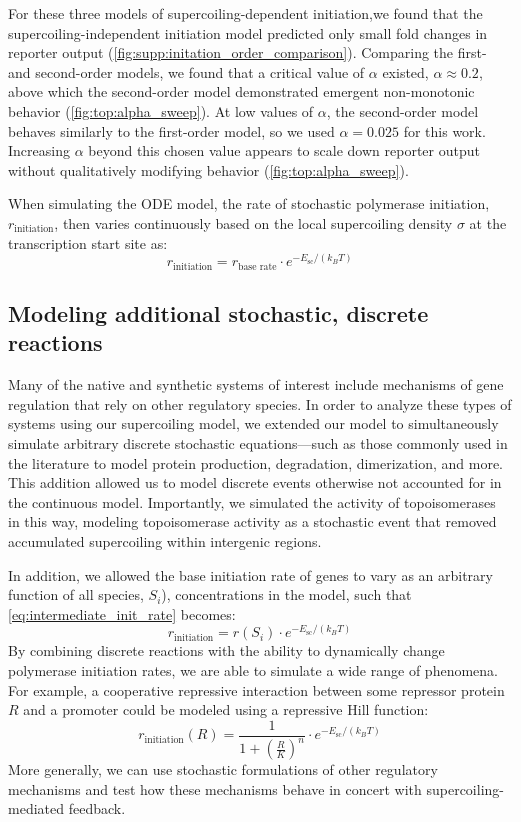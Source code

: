 \documentclass[11pt]{article}
\begin{document}
For these three models of supercoiling-dependent initiation,we found that the supercoiling-independent initiation model predicted only small fold changes in reporter output (\cref{fig:supp:initation_order_comparison}). Comparing the first- and second-order models, we found that a critical value of \(\alpha\) existed, \(\alpha \approx 0.2\), above which the second-order model demonstrated emergent non-monotonic behavior (\cref{fig:top:alpha_sweep}). At low values of \(\alpha\), the second-order model behaves similarly to the first-order model, so we used \(\alpha = 0.025\) for this work. Increasing \(\alpha\) beyond this chosen value appears to scale down reporter output without qualitatively modifying behavior (\cref{fig:top:alpha_sweep}).


When simulating the ODE model, the rate of stochastic polymerase initiation, \(r_\text{initiation}\), then varies continuously based on the local supercoiling density \(\sigma\) at the transcription start site as:
\begin{equation}
    r_\text{initiation} = r_\text{base rate} \cdot e^{- E_\text{sc} / (k_B T)}
\label{eq:intermediate_init_rate}
\end{equation}


\subsection{Modeling additional stochastic, discrete reactions}
Many of the native and synthetic systems of interest include mechanisms of gene regulation that rely on other regulatory species. In order to analyze these types of systems using our supercoiling model, we extended our model to simultaneously simulate arbitrary discrete stochastic equations---such as those commonly used in the literature to model protein production, degradation, dimerization, and more. This addition allowed us to model discrete events otherwise not accounted for in the continuous model. Importantly, we simulated the activity of topoisomerases in this way, modeling topoisomerase activity as a stochastic event that removed accumulated supercoiling within intergenic regions.

In addition, we allowed the base initiation rate of genes to vary as an arbitrary function of all species, \(S_i\)), concentrations in the model, such that \cref{eq:intermediate_init_rate} becomes:
\begin{equation}
    r_\text{initiation} = r(S_i) \cdot e^{- E_\text{sc} / (k_B T)}
\label{eq:final_init_rate}
\end{equation}
By combining discrete reactions with the ability to dynamically change polymerase initiation rates, we are able to simulate a wide range of phenomena.
For example, a cooperative repressive interaction between some repressor protein \(R\) and a promoter could be modeled using a repressive Hill function:
\begin{equation*}
    r_\text{initiation}(R) = \frac{1}{1 + \left(\frac{R}{K}\right)^n} \cdot e^{-E_\text{sc} / (k_B T)}
\end{equation*}
More generally, we can use stochastic formulations of other regulatory mechanisms and test how these mechanisms behave in concert with supercoiling-mediated feedback.
\end{document}
